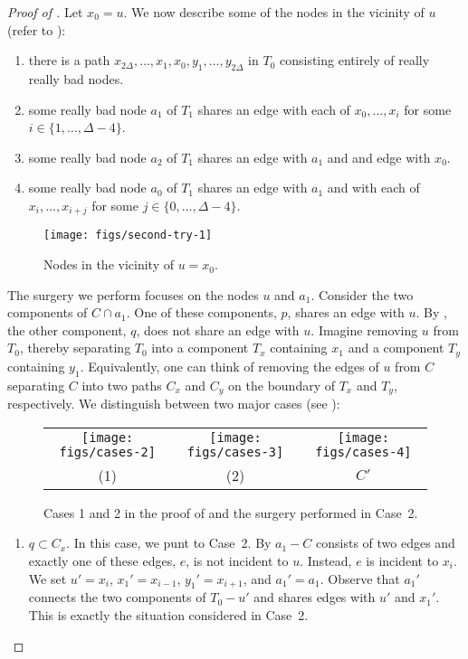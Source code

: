\documentclass{patmorin}
\begin{document}
\begin{proof}[Proof of ]
Let $x_0=u$. We now describe some of the nodes in the vicinity of $u$ (refer to ):
\begin{enumerate}
  \item there is a path
    $x_{2\Delta},\ldots,x_1,x_0,y_1,\ldots,y_{2\Delta}$
    in $T_0$ consisting entirely of really really bad nodes.
  \item some really bad node $a_1$ of $T_1$ shares an edge with each of
    $x_0,\ldots,x_i$ for some $i\in\{1,\ldots,\Delta-4\}$.
  \item some really bad node $a_2$ of $T_1$ shares an edge with $a_1$ and
    and edge with $x_0$. 
  \item some really bad node $a_0$ of $T_1$ shares an edge with $a_1$ and
    with each of $x_i,\ldots,x_{i+j}$ for some $j\in\{0,\ldots,\Delta-4\}$.
\end{enumerate}

\begin{figure}
   \begin{center}\texttt{[image: figs/second-try-1]}\end{center}
   \caption{Nodes in the vicinity of $u=x_0$.}
\end{figure}

The surgery we perform focuses on the nodes $u$ and $a_1$.  Consider
the two components of $C\cap a_1$. One of these components, $p$, shares
an edge with $u$.  By , the other component,
$q$, does not share an edge with $u$.  Imagine removing $u$ from $T_0$,
thereby separating $T_0$ into a component $T_x$ containing $x_1$ and a
component $T_y$ containing $y_1$.  Equivalently, one can think of removing
the edges of $u$ from $C$ separating $C$ into two paths $C_x$ and $C_y$
on the boundary of $T_x$ and $T_y$, respectively.  We distinguish between
two major cases (see ):

\begin{figure}
   \begin{center}
     \begin{tabular}{ccc}
       \texttt{[image: figs/cases-2]} &
       \texttt{[image: figs/cases-3]} &
       \texttt{[image: figs/cases-4]} \\
       (1) & (2) & $C'$
     \end{tabular}
   \end{center}
   \caption{Cases 1 and 2 in the proof of  and the surgery performed in Case~2.}
\end{figure}
\begin{enumerate}
   \item $q\subset C_x$.  In this case, we punt to Case~2. By
    $a_1-C$ consists of two edges and exactly
   one of these edges, $e$, is not incident to $u$. Instead, $e$ is
   incident to    $x_i$.  We set $u'=x_i$, $x_1'=x_{i-1}$, $y_1'=x_{i+1}$,
   and $a_1'=a_1$. Observe that $a_1'$ connects the two components of
   $T_0-u'$ and shares edges with $u'$ and $x_1'$. This is exactly the
   situation considered in Case~2.


\end{enumerate}
\end{proof}
\end{document}
